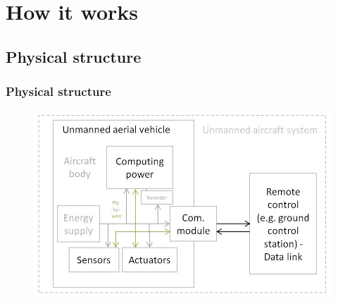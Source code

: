 \section{How it works}

\begin{frame}
\tableofcontents[
    currentsection, 
    sectionstyle=show/shaded, 
    subsectionstyle=hide
]
\end{frame}


\subsection*{Physical structure}
\begin{frame}
\frametitle{Physical structure}
\begin{figure}[H]
  \begin{center}
  \includegraphics[scale=0.45]{fig/uav_hardware.jpg}
  \end{center}
\end{figure}

\end{frame}



